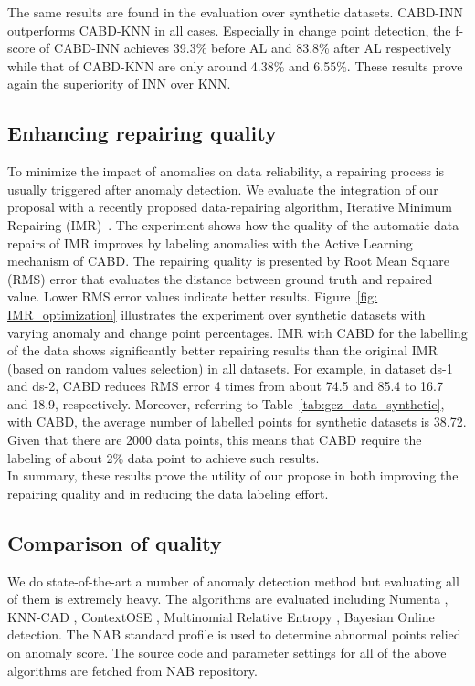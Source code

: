 The same results are found in the evaluation over synthetic datasets. CABD-INN outperforms CABD-KNN in all cases. Especially in change point detection, the f-score of CABD-INN achieves 39.3\% before AL and 83.8\% after AL respectively while that of CABD-KNN are only around 4.38\% and 6.55\%. These results prove again the superiority of INN over KNN. 

\subsection{Enhancing repairing quality}

To minimize the impact of anomalies on data reliability, a repairing process is usually triggered after anomaly detection. We evaluate the integration of our proposal with a recently proposed data-repairing algorithm, Iterative Minimum Repairing (IMR)~\cite{song2015screen,zhang2017time}. The experiment shows how the quality of the automatic data repairs of IMR improves by %
labeling anomalies with the Active Learning mechanism of CABD. The repairing quality is presented by Root Mean Square (RMS) error that evaluates the distance between ground truth and repaired value. Lower RMS error values indicate better results. Figure~\ref{fig: IMR_optimization} illustrates the experiment over synthetic datasets with varying anomaly and change point percentages. IMR with CABD for the labelling of the data shows significantly better repairing results than the original IMR (based on random values selection) in all datasets. For example, in dataset ds-1 and ds-2, CABD reduces RMS error 4 times from about 74.5 and 85.4 to 16.7 and 18.9, respectively. Moreover, referring to Table~\ref{tab:gcz_data_synthetic}, with CABD, the average number of labelled points for synthetic datasets is 38.72. Given that there are 2000 data points, this means that CABD require the labeling of about 2\% data point to achieve such results. \\

In summary, these results prove the utility of our propose in both improving the repairing quality and in reducing the data labeling effort.

\subsection{Comparison of quality}
We do state-of-the-art a number of anomaly detection method but evaluating all of them is extremely heavy. The algorithms are evaluated including Numenta \cite{ahmad2017unsupervised}, KNN-CAD \cite{burnaev2016conformalized}, ContextOSE \cite{ContextOSE}, Multinomial Relative Entropy \cite{wang2011statistical}, Bayesian Online detection\cite{adams2007bayesian}. The NAB standard profile is used to determine abnormal points relied on anomaly score. The source code and parameter settings for all of the above algorithms are fetched from NAB repository. \\


